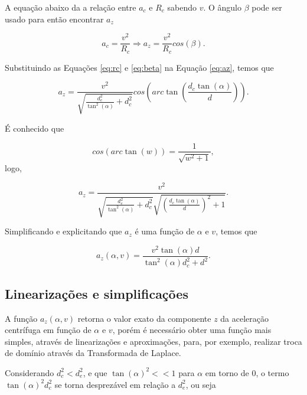         A equação abaixo da a relação entre $a_c$ e $R_c$ sabendo $v$. O ângulo $\beta$ pode ser usado para então encontrar $a_z$
        
        \begin{equation}
            a_c = \frac{v^2}{R_c} \Rightarrow a_z = \frac{v^2}{R_c}cos(\beta).
            \label{eq:az}
        \end{equation}
        
        Substituindo as Equações \eqref{eq:rc} e \eqref{eq:beta} na Equação \eqref{eq:az}, temos que
        
        \begin{equation}
            a_z = \frac{v^2}{\sqrt{\frac{d_e^2}{\tan^2(\alpha)} + d_c^2}}cos(arc\tan(\frac{d_c \tan(\alpha)}{d})).
        \end{equation}
        
        É conhecido que
        
        \begin{equation}
            cos(arc\tan (w)) = \frac{1}{\sqrt{w^2+1}},
        \end{equation}
        logo,
        
        \begin{equation}
            a_z = \frac{v^2}{\sqrt{\frac{d_e^2}{\tan^2(\alpha)} + d_c^2}   \sqrt{(\frac{d_c \tan(\alpha)}{d})^2+1}}.
        \end{equation}
        
        Simplificando e explicitando que $a_z$ é uma função de $\alpha$ e $v$, temos que
        
        \begin{equation}
            a_z(\alpha, v) = \frac{v^2\tan(\alpha)d}{\tan^2(\alpha)d_c^2+d^2}.
        \end{equation}
        
        \subsection{Linearizações e simplificações}
    
            A função $a_z(\alpha,v)$ retorna o valor exato da componente $z$ da aceleração centrífuga em função de $\alpha$ e $v$, porém é necessário obter uma função mais simples, através de linearizações e aproximações, para, por exemplo, realizar troca de domínio através da Transformada de Laplace.
            
            Considerando $d_c^2 < d_e^2$, e que $\tan(\alpha)^2 << 1$ para $\alpha$ em torno de $0$, o termo $\tan(\alpha)^2d_c^2$ se torna desprezável em relação a $d_e^2$, ou seja
            
